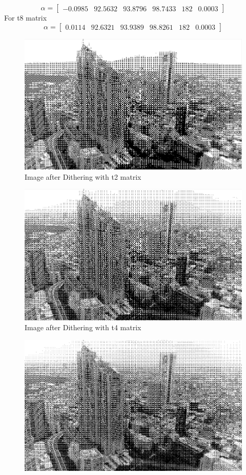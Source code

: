 \documentclass{article}
\begin{document}
\begin{enumerate}
    \[
    \alpha=
    \begin{bmatrix} 
      -0.0985 &	92.5632 &	93.8796 &	98.7433 &	182 &	0.0003 
    \end{bmatrix}
    \]
    For t8 matrix
    \[
    \alpha=
    \begin{bmatrix} 
      0.0114 &	92.6321 &	93.9389 &	98.8261 &	182 &	0.0003 
    \end{bmatrix}
    \]
    \begin{figure}[H]
        \centering
        \includegraphics[width=0.75\linewidth]{331.png}
        \caption{Image after Dithering with t2 matrix}
        \label{fig:Image after Dithering with t2 matrix}
    \end{figure}
    \begin{figure}[H]
        \centering
        \includegraphics[width=0.75\linewidth]{332.png}
        \caption{Image after Dithering with t4 matrix}
        \label{fig:Image after Dithering with t2 matrix}
    \end{figure}
    \begin{figure}[H]
        \centering
        \includegraphics[width=0.75\linewidth]{333.png}

\end{figure}
\end{enumerate}
\end{document}
